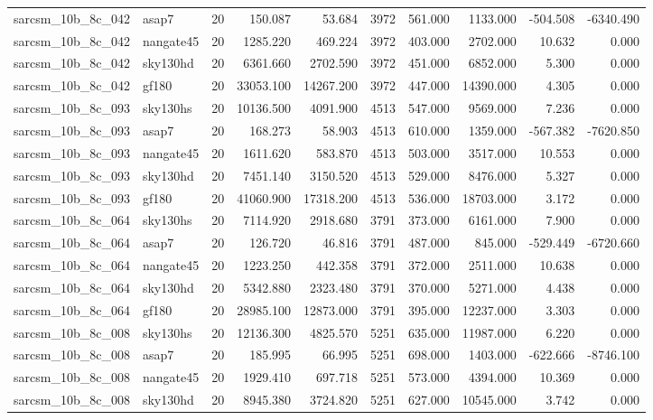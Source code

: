 \documentclass{article}
\begin{document}
\begin{longtable}{llrrrrrrrr}
sarcsm\_10b\_8c\_042 & asap7 & 20 & 150.087 & 53.684 & 3972 & 561.000 & 1133.000 & -504.508 & -6340.490 \\
sarcsm\_10b\_8c\_042 & nangate45 & 20 & 1285.220 & 469.224 & 3972 & 403.000 & 2702.000 & 10.632 & 0.000 \\
sarcsm\_10b\_8c\_042 & sky130hd & 20 & 6361.660 & 2702.590 & 3972 & 451.000 & 6852.000 & 5.300 & 0.000 \\
sarcsm\_10b\_8c\_042 & gf180 & 20 & 33053.100 & 14267.200 & 3972 & 447.000 & 14390.000 & 4.305 & 0.000 \\
sarcsm\_10b\_8c\_093 & sky130hs & 20 & 10136.500 & 4091.900 & 4513 & 547.000 & 9569.000 & 7.236 & 0.000 \\
sarcsm\_10b\_8c\_093 & asap7 & 20 & 168.273 & 58.903 & 4513 & 610.000 & 1359.000 & -567.382 & -7620.850 \\
sarcsm\_10b\_8c\_093 & nangate45 & 20 & 1611.620 & 583.870 & 4513 & 503.000 & 3517.000 & 10.553 & 0.000 \\
sarcsm\_10b\_8c\_093 & sky130hd & 20 & 7451.140 & 3150.520 & 4513 & 529.000 & 8476.000 & 5.327 & 0.000 \\
sarcsm\_10b\_8c\_093 & gf180 & 20 & 41060.900 & 17318.200 & 4513 & 536.000 & 18703.000 & 3.172 & 0.000 \\
sarcsm\_10b\_8c\_064 & sky130hs & 20 & 7114.920 & 2918.680 & 3791 & 373.000 & 6161.000 & 7.900 & 0.000 \\
sarcsm\_10b\_8c\_064 & asap7 & 20 & 126.720 & 46.816 & 3791 & 487.000 & 845.000 & -529.449 & -6720.660 \\
sarcsm\_10b\_8c\_064 & nangate45 & 20 & 1223.250 & 442.358 & 3791 & 372.000 & 2511.000 & 10.638 & 0.000 \\
sarcsm\_10b\_8c\_064 & sky130hd & 20 & 5342.880 & 2323.480 & 3791 & 370.000 & 5271.000 & 4.438 & 0.000 \\
sarcsm\_10b\_8c\_064 & gf180 & 20 & 28985.100 & 12873.000 & 3791 & 395.000 & 12237.000 & 3.303 & 0.000 \\
sarcsm\_10b\_8c\_008 & sky130hs & 20 & 12136.300 & 4825.570 & 5251 & 635.000 & 11987.000 & 6.220 & 0.000 \\
sarcsm\_10b\_8c\_008 & asap7 & 20 & 185.995 & 66.995 & 5251 & 698.000 & 1403.000 & -622.666 & -8746.100 \\
sarcsm\_10b\_8c\_008 & nangate45 & 20 & 1929.410 & 697.718 & 5251 & 573.000 & 4394.000 & 10.369 & 0.000 \\
sarcsm\_10b\_8c\_008 & sky130hd & 20 & 8945.380 & 3724.820 & 5251 & 627.000 & 10545.000 & 3.742 & 0.000 \\

\end{longtable}
\end{document}
